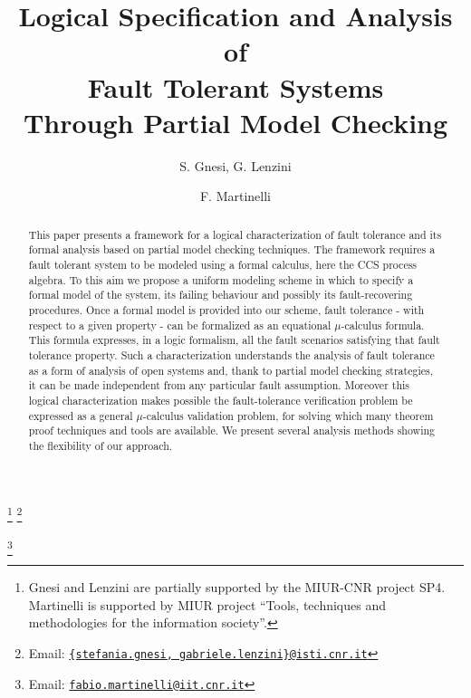 \documentclass{entcs}
\begin{document}
\begin{frontmatter}
  \title{Logical Specification and Analysis of
      \\ Fault Tolerant Systems
      \\ Through Partial Model Checking}

\author{S. Gnesi, G. Lenzini }
  \address{Istituto di Scienze e Tecnologie Informatiche - C.N.R. \\
           Via G. Moruzzi 1, I-56100 Pisa, Italy}


\author{F. Martinelli }
  \address{Istituto di Informatica e Telematica - C.N.R. \\
           Via G. Moruzzi 1, I-56100 Pisa, Italy}

  \thanks[ALL]{Gnesi and Lenzini are partially supported by the MIUR-CNR project SP4. Martinelli is supported by MIUR project
  ``Tools, techniques and methodologies for the information society''.}
  \thanks[gl-mail]{Email: \href{stefania.gnesi,gabriele.lenzini@isti.cnr.it}
  {\texttt{\normalshape \{stefania.gnesi, gabriele.lenzini\}@isti.cnr.it}}}


  \thanks[fabio-mail]{Email: \href{fabrio.martinelli@iit.cnr.it}
  {\texttt{\normalshape fabio.martinelli@iit.cnr.it}}}

\begin{abstract}
  This paper presents a framework for a logical characterization of fault
  tolerance and its formal analysis based on partial model checking
  techniques. The framework requires a fault tolerant system to be modeled
  using a formal calculus, here the CCS process algebra. To this aim we
  propose a uniform modeling scheme in which to specify a formal model of the
  system, its failing behaviour and possibly its fault-recovering procedures.
  Once a formal model is provided into our scheme, fault tolerance - with
  respect to a given property - can be formalized as an equational
  $\mu$-calculus formula. This formula expresses, in a logic formalism, all
  the fault scenarios satisfying that fault tolerance property. Such a
  characterization understands the analysis of fault tolerance as a form of
  analysis of open systems and, thank to partial model checking strategies, it
  can be made independent from any particular fault assumption. Moreover this
  logical characterization makes possible the fault-tolerance verification
  problem be expressed as a general $\mu$-calculus validation problem, for
  solving which many theorem proof techniques and tools are available. We
  present several analysis methods showing the flexibility of our approach.
\end{abstract}


\end{frontmatter}
\end{document}
